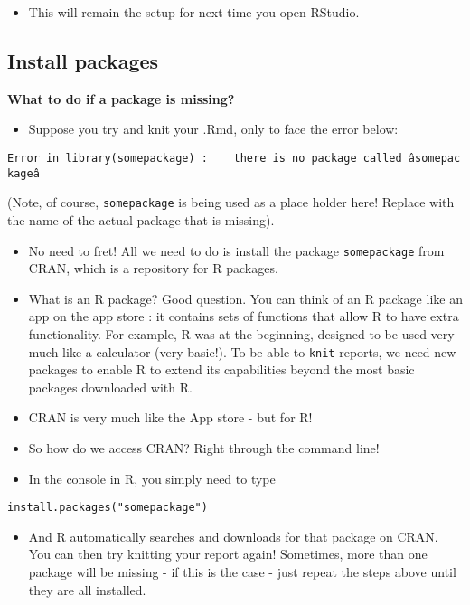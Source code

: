 \documentclass[]{article}
\providecommand{\tightlist}{%
  \setlength{\itemsep}{0pt}\setlength{\parskip}{0pt}}
\begin{document}
\begin{itemize}
\tightlist
\item
  This will remain the setup for next time you open RStudio.
\end{itemize}

\hypertarget{install-packages}{%
\subsection{Install packages}\label{install-packages}}

\textbf{What to do if a package is missing?}

\begin{itemize}
\tightlist
\item
  Suppose you try and knit your .Rmd, only to face the error below:
\end{itemize}

\texttt{Error\ in\ library(somepackage)\ :\ \ \ \ there\ is\ no\ package\ called\ âsomepackageâ}

(Note, of course, \texttt{somepackage} is being used as a place holder here! Replace with the name of the actual package that is missing).

\begin{itemize}
\item
  No need to fret! All we need to do is install the package \texttt{somepackage} from CRAN, which is a repository for R packages.
\item
  What is an R package? Good question. You can think of an R package like an app on the app store : it contains sets of functions that allow R to have extra functionality. For example, R was at the beginning, designed to be used very much like a calculator (very basic!). To be able to \texttt{knit} reports, we need new packages to enable R to extend its capabilities beyond the most basic packages downloaded with R.
\end{itemize}

\begin{itemize}
\item
  CRAN is very much like the App store - but for R!
\item
  So how do we access CRAN? Right through the command line!
\item
  In the console in R, you simply need to type
\end{itemize}

\texttt{install.packages("somepackage")}

\begin{itemize}
\tightlist
\item
  And R automatically searches and downloads for that package on CRAN. You can then try knitting your report again! Sometimes, more than one package will be missing - if this is the case - just repeat the steps above until they are all installed.
\end{itemize}
\end{document}
